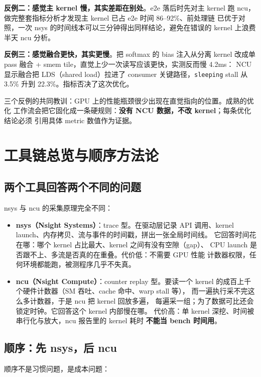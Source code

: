 \textbf{反例二：感觉主 kernel 慢，其实差距在别处}。e2e 落后时先对主 kernel
跑 ncu，做完整套指标分析才发现主 kernel 已占 e2e 时间 86--92\%、前处理链
已优于对照，一次 nsys 的时间线本可以三分钟得出同样结论，避免在错误的
kernel 上浪费半天 ncu 分析。

\textbf{反例三：感觉融合更快，其实更慢}。把 softmax 的 bias 注入从分离 kernel
改成单 pass 融合 + smem tile，直觉上少一次读写应该更快，实测反而慢 4.2ms：
NCU 显示融合把 LDS（shared load）拉进了 consumer 关键路径，\texttt{sleeping}
stall 从 3.5\% 升到 22.3\%。指标否决了这次优化。

三个反例的共同教训：GPU 上的性能瓶颈很少出现在直觉指向的位置。成熟的优化
工作流会把它固化成一条硬规则：\textbf{没有 NCU 数据，不改 kernel}；每条优化结论必须
引用具体 metric 数值作为证据。

\section{工具链总览与顺序方法论}\label{sec:ch00-tools}

\subsection{两个工具回答两个不同的问题}

nsys 与 ncu 的采集原理完全不同：

\begin{itemize}
\item \textbf{nsys（Nsight Systems）}：trace 型。在驱动层记录 API
  调用、kernel launch、内存拷贝、流与事件的时间戳，拼出一张全局时间线。
  它回答时间花在哪：哪个 kernel 占比最大、kernel 之间有没有空隙（gap）、
  CPU launch 是否跟不上、多流是否真的在重叠。代价低：不需要 GPU 性能
  计数器权限，任何环境都能跑，被测程序几乎不失真。
\item \textbf{ncu（Nsight Compute）}：counter replay 型。要读一个
  kernel 的成百上千个硬件计数器（SM 吞吐、cache 命中、warp stall 等），
  而一遍执行采不完这么多计数器，于是 ncu 把 kernel 回放多遍，
  每遍采一组；为了数据可比还会锁定时钟。它回答这个 kernel 内部慢在哪。
  代价高：单 kernel 深挖、时间被串行化与放大，ncu 报告里的 kernel 耗时
  \textbf{不能当 bench 时间用}。
\end{itemize}

\subsection{顺序：先 nsys，后 ncu}

顺序不是习惯问题，是成本问题：

